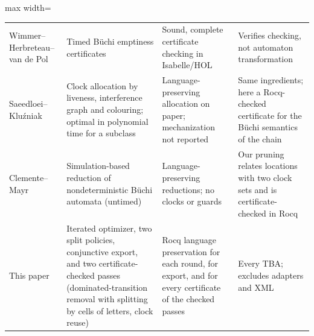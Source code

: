 \begin{table}[t]
\begin{adjustbox}{max width=\textwidth}
\begin{tabular}{@{}>{\raggedright\arraybackslash}p{}>{\raggedright\arraybackslash}p{}>{\raggedright\arraybackslash}p{}>{\raggedright\arraybackslash}p{}@{}}
Wimmer--Herbreteau--van de Pol~\cite{wimmer_herbreteau_vandepol_formats2020} & Timed B\"uchi emptiness certificates & Sound, complete certificate checking in Isabelle/HOL & Verifies checking, not automaton transformation\\
Saeedloei--Kluźniak~\cite{saeedloei_kluzniak_hscc2018} & Clock allocation by liveness, interference graph and colouring; optimal in polynomial time for a subclass & Language-preserving allocation on paper; mechanization not reported & Same ingredients; here a Rocq-checked certificate for the Büchi semantics of the chain\\
Clemente--Mayr~\cite{clemente_mayr_lmcs19} & Simulation-based reduction of nondeterministic Büchi automata (untimed) & Language-preserving reductions; no clocks or guards & Our pruning relates locations with two clock sets and is certificate-checked in Rocq\\
This paper & Iterated optimizer, two split policies, conjunctive export, and two certificate-checked passes (dominated-transition removal with splitting by cells of letters, clock reuse) & Rocq language preservation for each round, for export, and for every certificate of the checked passes & Every TBA; excludes adapters and XML\\
\bottomrule
\end{tabular}\end{adjustbox}
\end{table}


